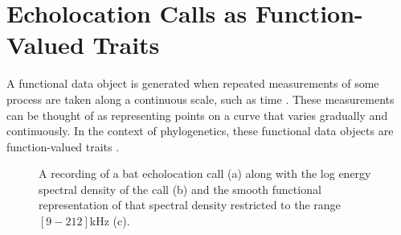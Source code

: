 \documentclass{ws-rv9x6}
\begin{document}
\section{Echolocation Calls as Function-Valued Traits}
\label{sec:funrep}
A functional data object is generated when repeated measurements of some process are taken along a continuous scale, such as time \cite{ramsay2006functional}. 
These measurements can be thought of as representing points on a curve that varies gradually and continuously. In the context of phylogenetics, these functional data objects are function-valued traits \cite{meyer2005up}.

\begin{figure}
	\centering
	\caption{A recording of a bat echolocation call (a) along with the log energy spectral density of the call (b) and the smooth functional representation of that spectral density restricted to the range \([9-212]\)kHz (c).}
\end{figure}
\end{document}
